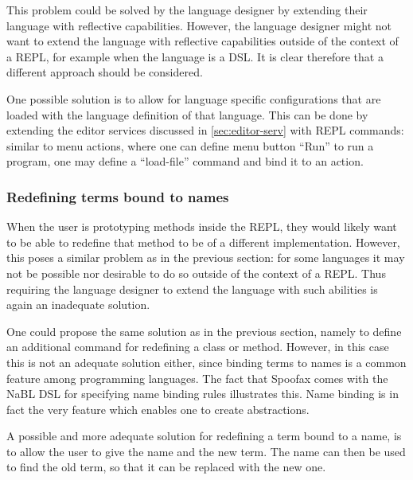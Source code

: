 This problem could be solved by the language designer by extending
their language with reflective capabilities. However, the language
designer might not want to extend the language with reflective
capabilities outside of the context of a REPL, for example when the
language is a DSL. It is clear therefore that a different approach
should be considered.

One possible solution is to allow for language specific configurations
that are loaded with the language definition of that language. This
can be done by extending the editor services discussed in
\cref{sec:editor-serv} with REPL commands: similar to menu actions,
where one can define menu button ``Run'' to run a program, one may
define a ``load-file'' command and bind it to an action.

\subsubsection{Redefining terms bound to names}
\label{sec:redef-cont-bound}
When the user is prototyping methods inside the REPL, they would
likely want to be able to redefine that method to be of a different
implementation. However, this poses a similar problem as in the
previous section: for some languages it may not be possible nor
desirable to do so outside of the context of a REPL. Thus requiring
the language designer to extend the language with such abilities is
again an inadequate solution.

One could propose the same solution as in the previous section, namely
to define an additional command for redefining a class or
method. However, in this case this is not an adequate solution either,
since binding terms to names is a common feature among programming
languages. The fact that Spoofax comes with the NaBL DSL for
specifying name binding rules illustrates this. Name binding is in
fact the very feature which enables one to create abstractions.

A possible and more adequate solution for redefining a term bound to a
name, is to allow the user to give the name and the new term. The name
can then be used to find the old term, so that it can be replaced with
the new one.

